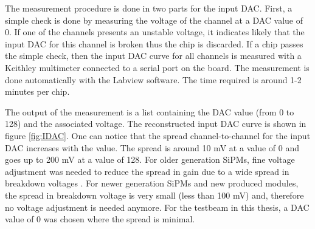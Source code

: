 The measurement procedure is done in two parts for the input DAC. First, a simple check is done by measuring the voltage of the channel at a DAC value of 0. If one of the channels presents an unstable voltage, it indicates likely that the input DAC for this channel is broken thus the chip is discarded. If a chip passes the simple check, then the input DAC curve for all channels is measured with a Keithley multimeter connected to a serial port on the board. The measurement is done automatically with the Labview software. The time required is around 1-2 minutes per chip.

The output of the measurement is a list containing the DAC value (from 0 to 128) and the associated voltage. The reconstructed input DAC curve is shown in figure \ref{fig:IDAC}. One can notice that the spread channel-to-channel for the input DAC increases with the value. The spread is around 10 mV at a value of 0 and goes up to 200 mV at a value of 128. For older generation SiPMs, fine voltage adjustment was needed to reduce the spread in gain due to a wide spread in breakdown voltages \cite{Hartbrich2012}. For newer generation SiPMs and new produced modules, the spread in breakdown voltage is very small (less than 100 mV) and, therefore no voltage adjustment is needed anymore. For the testbeam in this thesis, a DAC value of 0 was chosen where the spread is minimal.

